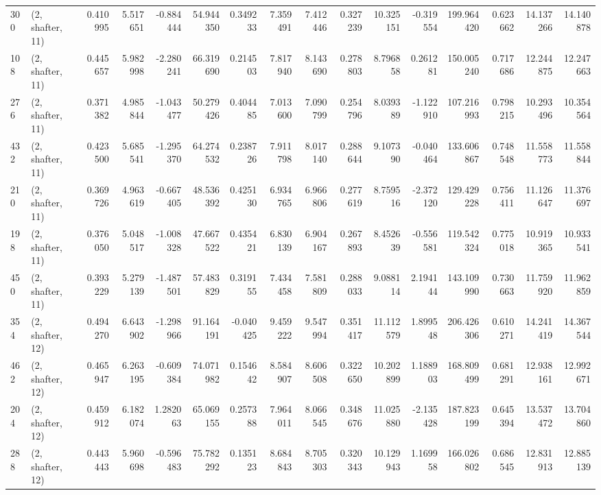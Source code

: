 \begin{tabular}{llrrrrrrrrrrrrrr}
300 &  (2, shafter, 11) &   0.410995 &   5.517651 &  -0.884444 &    54.944350 &   0.349233 &   7.359491 &   7.412446 &  0.327239 &  10.325151 &  -0.319554 &   199.964420 &  0.623662 &  14.137266 &  14.140878 \\
108 &  (2, shafter, 11) &   0.445657 &   5.982998 &  -2.280241 &    66.319690 &   0.214503 &   7.817940 &   8.143690 &  0.278803 &   8.796858 &   0.261281 &   150.005240 &  0.717686 &  12.244875 &  12.247663 \\
276 &  (2, shafter, 11) &   0.371382 &   4.985844 &  -1.043477 &    50.279426 &   0.404485 &   7.013600 &   7.090799 &  0.254796 &   8.039389 &  -1.122910 &   107.216993 &  0.798215 &  10.293496 &  10.354564 \\
432 &  (2, shafter, 11) &   0.423500 &   5.685541 &  -1.295370 &    64.274532 &   0.238726 &   7.911798 &   8.017140 &  0.288644 &   9.107390 &  -0.040464 &   133.606867 &  0.748548 &  11.558773 &  11.558844 \\
210 &  (2, shafter, 11) &   0.369726 &   4.963619 &  -0.667405 &    48.536392 &   0.425130 &   6.934765 &   6.966806 &  0.277619 &   8.759516 &  -2.372120 &   129.429228 &  0.756411 &  11.126647 &  11.376697 \\
198 &  (2, shafter, 11) &   0.376050 &   5.048517 &  -1.008328 &    47.667522 &   0.435421 &   6.830139 &   6.904167 &  0.267893 &   8.452639 &  -0.556581 &   119.542324 &  0.775018 &  10.919365 &  10.933541 \\
450 &  (2, shafter, 11) &   0.393229 &   5.279139 &  -1.487501 &    57.483829 &   0.319155 &   7.434458 &   7.581809 &  0.288033 &   9.088114 &   2.194144 &   143.109990 &  0.730663 &  11.759920 &  11.962859 \\
354 &  (2, shafter, 12) &   0.494270 &   6.643902 &  -1.298966 &    91.164191 &  -0.040425 &   9.459222 &   9.547994 &  0.351417 &  11.112579 &   1.899548 &   206.426306 &  0.610271 &  14.241419 &  14.367544 \\
462 &  (2, shafter, 12) &   0.465947 &   6.263195 &  -0.609384 &    74.071982 &   0.154642 &   8.584907 &   8.606508 &  0.322650 &  10.202899 &   1.188903 &   168.809499 &  0.681291 &  12.938161 &  12.992671 \\
204 &  (2, shafter, 12) &   0.459912 &   6.182074 &   1.282063 &    65.069155 &   0.257388 &   7.964011 &   8.066545 &  0.348676 &  11.025880 &  -2.135428 &   187.823199 &  0.645394 &  13.537472 &  13.704860 \\
288 &  (2, shafter, 12) &   0.443443 &   5.960698 &  -0.596483 &    75.782292 &   0.135123 &   8.684843 &   8.705303 &  0.320343 &  10.129943 &   1.169958 &   166.026802 &  0.686545 &  12.831913 &  12.885139 \\

\end{tabular}
